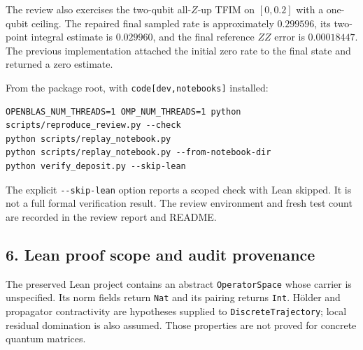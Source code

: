 \documentclass[
]{article}
\begin{document}
The review also exercises the two-qubit all-\(Z\)-up TFIM on \([0,0.2]\) with a one-qubit ceiling. The repaired final sampled rate is approximately \(0.299596\), its two-point integral estimate is \(0.029960\), and the final reference \(ZZ\) error is \(0.00018447\). The previous implementation attached the initial zero rate to the final state and returned a zero estimate.

From the package root, with \texttt{code{[}dev,notebooks{]}} installed:

\begin{verbatim}
OPENBLAS_NUM_THREADS=1 OMP_NUM_THREADS=1 python scripts/reproduce_review.py --check
python scripts/replay_notebook.py
python scripts/replay_notebook.py --from-notebook-dir
python verify_deposit.py --skip-lean
\end{verbatim}

The explicit \texttt{-\/-skip-lean} option reports a scoped check with Lean skipped. It is not a full formal verification result. The review environment and fresh test count are recorded in the review report and README.

\subsection{6. Lean proof scope and audit provenance}\label{lean-proof-scope-and-audit-provenance}

The preserved Lean project contains an abstract \texttt{OperatorSpace} whose carrier is unspecified. Its norm fields return \texttt{Nat} and its pairing returns \texttt{Int}. Hölder and propagator contractivity are hypotheses supplied to \texttt{DiscreteTrajectory}; local residual domination is also assumed. Those properties are not proved for concrete quantum matrices.
\end{document}
